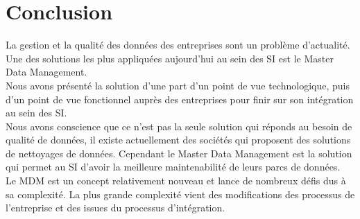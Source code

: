 \section{Conclusion}
	La gestion et la qualité des données des entreprises sont un problème d'actualité. Une des solutions les plus appliquées aujourd'hui au sein des SI est le Master Data Management. \\
Nous avons présenté la solution d'une part d'un point de vue technologique, puis d'un point de vue fonctionnel auprès des entreprises pour finir sur son intégration au sein des SI.\\
Nous avons conscience que ce n'est pas la seule solution qui réponds au besoin de qualité de données, il existe actuellement des sociétés qui proposent des solutions de nettoyages de données. Cependant le Master Data Management est la solution qui permet au SI d'avoir la meilleure maintenabilité de leurs parcs de données.\\
Le MDM est un concept relativement nouveau et lance de nombreux défis dus à sa complexité. La plus grande complexité vient des modifications des processus de l'entreprise et des issues du processus d'intégration.